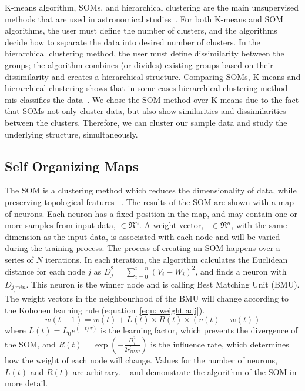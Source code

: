 K-means algorithm, SOMs, and hierarchical clustering are the main unsupervised methods that are used in astronomical studies~\citep[e.g.][]{DAbrusco12, Aycha16}. %
For both K-means and SOM algorithms, the user must define the number of clusters, and the algorithms decide how to separate the data into desired number of clusters.
In the hierarchical clustering method, the user must define dissimilarity between the groups; the algorithm combines (or divides) existing groups based on their dissimilarity and creates a hierarchical structure. 
Comparing SOMs, K-means and hierarchical clustering shows that in some cases hierarchical clustering method mis-classifies the data~\citep[][and references therein]{Mangiameli96}.
We chose the SOM method over K-means due to the fact that SOMs not only cluster data, but also show similarities and dissimilarities between the clusters.
Therefore, we can cluster our sample data and study the underlying structure, simultaneously.

 \subsection{Self Organizing Maps}
 \label{sec: som}
 The SOM is a clustering method which reduces the dimensionality of data, while preserving topological features ~\citep{Kohonen98}. 
 The results of the SOM are shown with a map of neurons.
 Each neuron has a fixed position in the map, and may contain one or more samples from input data,  $\in \Re^n$.
 A weight vector,~ $\in \Re^n$, with the same dimension as the input data, is associated with each node and will be varied during the training process.
 The process of creating an SOM  happens over a series of $N$ iterations.
 In each iteration, the algorithm calculates the Euclidean distance for each node $j$ as  $D_j^2= \sum_{i=0}^{i=n} (V_i - W_i)^2$, and finds a neuron with $D_{j_,{\mathrm min}}$. 
 This neuron is the winner node and is calling Best Matching Unit (BMU). 
 The weight vectors in the neighbourhood of the BMU will change according to the Kohonen learning rule (equation~\ref{equ: weight adj}). 
  \begin{equation}
            \label{equ: weight adj}
            w(t+1)=w(t)+L(t) \times R(t) \times(v(t)-w(t))
 \end{equation}
where $L(t) = L_0 e^{(-t/\tau)}$ is the learning factor, which prevents the divergence of the SOM, and $R(t)=\exp(-\frac{D_j^2}{2r^t_{BMU}})$ is the influence rate, which determines how the weight of each node will change.
Values for the number of neurons, $L(t)$ and $R(t)$ are arbitrary. 
~\cite{Geach12} and \cite{Rahmani16b} demonstrate the algorithm of the SOM in more detail.


